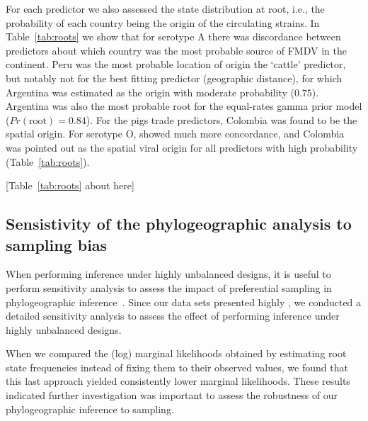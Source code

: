\documentclass[10pt]{article}
\begin{document}
For each predictor we also assessed the state distribution at root, i.e., the probability of each country being the origin of the circulating strains.
In Table~\ref{tab:roots} we show that for serotype A there was discordance between predictors about which country was the most probable source of FMDV in the continent.
Peru was the most probable location of origin the `cattle' predictor, but notably not for the best fitting predictor (geographic distance), for which Argentina was estimated as the origin with moderate probability ($0.75$).
Argentina was also the most probable root for the equal-rates gamma prior model ($Pr(\text{root})=0.84$).
For the pigs trade predictors, Colombia was found to be the spatial origin.
For serotype O, showed much more concordance, and Colombia was pointed out as the spatial viral origin for all predictors with high probability (Table~\ref{tab:roots}).


\begin{center}
 [Table~\ref{tab:roots} about here]
\end{center}

\subsection*{Sensistivity of the phylogeographic analysis to sampling bias}

When performing inference under highly unbalanced designs, it is useful to perform sensitivity analysis to assess the impact of preferential sampling in phylogeographic inference~\cite{Faria2012,polar,fluPNAS}. 
Since our data sets presented highly , we conducted a detailed sensitivity analysis to assess the effect of performing inference under highly unbalanced designs.

When we compared the (log) marginal likelihoods obtained by estimating root state frequencies instead of fixing them to their observed values, we found that this last approach yielded consistently lower marginal likelihoods.
These results indicated further investigation was important to assess the robustness of our phylogeographic inference to sampling. %
\end{document}
